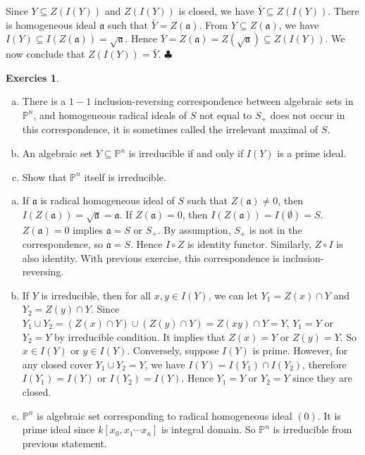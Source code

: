 \documentclass[12pt,a4paper]{article}
\theoremstyle{definition}
\newtheorem{exer}{Exercies}[subsection]
\newcommand*{\qeds}{\hfill\ensuremath{\clubsuit}}
\begin{document}
Since $Y \subseteq Z(I(Y))$ and $Z(I(Y))$ is closed, we have $\bar{Y} \subseteq Z(I(Y))$. There is homogeneous ideal $\mathfrak{a}$ such that $\bar{Y} = Z(\mathfrak{a})$. From $Y \subseteq Z(\mathfrak{a})$, we have $I(Y) \subseteq I(Z(\mathfrak{a})) = \sqrt{\mathfrak{a}}$. Hence $\bar{Y}= Z(\mathfrak{a}) = Z(\sqrt{\mathfrak{a}}) \subseteq Z(I(Y))$. We now conclude that $Z(I(Y))= \bar{Y}$.
\qeds
\begin{exer}
	\begin{enumerate}[a)]
	\item There is a $1-1$ inclusion-reversing correspondence between algebraic sets in $\mathbb{P}^n$, and homogeneous radical ideals of $S$ not equal to $S_+$ does not occur in this correspondence, it is sometimes called the irrelevant maximal of $S$.
	\item An algebraic set $Y \subseteq \mathbb{P}^n$ is irreducible if and only if $I(Y)$ is a prime ideal.
	\item Show that $\mathbb{P}^n$ itself is irreducible.
	\end{enumerate}
\end{exer}
\begin{enumerate}[a)]
	\item If $\mathfrak{a}$ is radical homogeneous ideal of $S$ such that $Z(\mathfrak{a}) \neq 0$, then $I(Z(\mathfrak{a})) = \sqrt{\mathfrak{a}} =\mathfrak{a}$. If $Z(\mathfrak{a})=0$, then $I(Z(\mathfrak{a}))= I(\emptyset) = S$. $Z(\mathfrak{a}) =0$ implies $\mathfrak{a}= S$ or $S_+$. By assumption, $S_+$ is not in the correspondence, so $\mathfrak{a}= S$. Hence $I \circ Z$ is identity functor. Similarly, $Z \circ I$ is also identity. With previous exercise, this correspondence is inclusion-reversing.
	\item If $Y$ is irreducible, then for all $x,y \in I(Y)$, we can let $Y_1= Z(x) \cap Y$ and $Y_2 = Z(y) \cap Y$. Since $Y_1 \cup Y_2 = (Z(x) \cap Y) \cup (Z(y)\cap Y)= Z(xy) \cap Y = Y$, $Y_1= Y$ or $Y_2=Y$ by irreducible condition. It implies that $Z(x)=Y$ or $Z(y)=Y$. So $x \in I(Y)$ or $y \in I(Y)$. Conversely, suppose $I(Y)$ is prime. However, for any closed cover $Y_1 \cup Y_2 =Y$, we have $I(Y)= I(Y_1) \cap I(Y_2)$, therefore $I(Y_1)=I(Y)$ or $I(Y_2)=I(Y)$. Hence $Y_1 = Y$ or $Y_2 =Y$ since they are closed.
	\item $\mathbb{P}^n$ is algebraic set corresponding to radical homogeneous ideal $(0)$. It is prime ideal since $k[x_0, x_1 \cdots x_n]$ is integral domain. So $\mathbb{P}^n$ is irreducible from previous statement.
	\end{enumerate}
\end{document}
